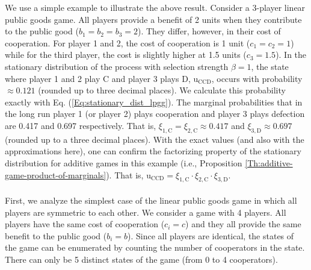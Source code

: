 \documentclass[11pt]{article}
\theoremstyle{plainCl1}
\theoremstyle{plainCl2}
\newcommand{\C}{\mathrm{C}}
\newcommand{\D}{\mathrm{D}}
\begin{document}
\noindent We use a simple example to illustrate the above result. Consider a 3-player linear public goods game. All players provide a benefit of 2 units when they contribute to the public good ($b_1 = b_2 = b_3 = 2$). They differ, however, in their cost of cooperation. For player 1 and 2, the cost of cooperation is 1 unit ($c_1 = c_2 = 1$) while for the third player, the cost is slightly higher at 1.5 units ($c_3 = 1.5$). In the stationary distribution of the process with selection strength $\beta = 1$, the state where player 1 and 2 play $\C$ and player 3 plays $\D$, $\mathrm{u}_{\C\C\D}$, occurs with probability $\approx 0.121$ (rounded up to three decimal places). We calculate this probability exactly with Eq. (\ref{Eq:stationary_dist_lpgg}). The marginal probabilities that in the long run player 1 (or player 2) plays cooperation and player 3 plays defection are 0.417 and 0.697 respectively. That is, $\xi_{1,\C} = \xi_{2,\C} \approx 0.417$ and $\xi_{3,\D} \approx 0.697$ (rounded up to a three decimal places). With the exact values (and also with the approximations here), one can confirm the factorizing property of the stationary distribution for additive games in this example (i.e., Proposition \ref{Th:additive-game-product-of-marginals}). That is, $\mathrm{u}_{\C\C\D} = \xi_{1,\C} \cdot \xi_{2,\C} \cdot \xi_{3,\D}$. \\ \\
\noindent First, we analyze the simplest case of the linear public goods game in which all players are symmetric to each other. We consider a game with 4 players. All players have the same cost of cooperation ($c_i = c$) and they all provide the same benefit to the public good ($b_i = b$). Since all players are identical, the states of the game can be enumerated by counting the number of cooperators in the state. There can only be 5 distinct states of the game (from 0 to 4 cooperators).
\end{document}

